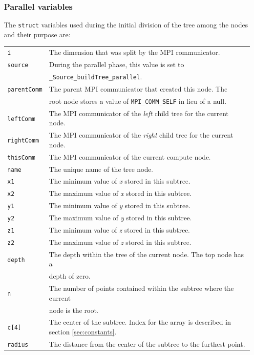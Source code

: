 \documentclass{article}
\begin{document}
%
%

\subsubsection{Parallel variables}

The \texttt{struct} variables used during the initial division of the tree among the nodes and their purpose are:

\begin{tabular}{l l}
\texttt{i} & The dimension that was split by the MPI communicator.  \\
\texttt{source} & During the parallel phase, this value is set to  \\
& \texttt{\_Source\_buildTree\_parallel}.  \\
\texttt{parentComm} & The parent MPI communicator that created this node. The\\
&  root node stores a value of \texttt{MPI\_COMM\_SELF} in lieu of a null. \\
\texttt{leftComm} & The MPI communicator of the \textit{left} child tree for the current node.  \\
\texttt{rightComm} & The MPI communicator of the \textit{right} child tree for the current node.  \\
\texttt{thisComm} & The MPI communicator of the current compute node.  \\
\texttt{name} & The unique name of the tree node. \\
\texttt{x1} & The minimum value of \textit{x} stored in this subtree.  \\
\texttt{x2} & The maximum value of \textit{x} stored in this subtree.  \\
\texttt{y1} & The minimum value of \textit{y} stored in this subtree.  \\
\texttt{y2} & The maximum value of \textit{y} stored in this subtree.  \\
\texttt{z1} & The minimum value of \textit{z} stored in this subtree.  \\
\texttt{z2} & The maximum value of \textit{z} stored in this subtree.  \\
\texttt{depth} & The depth within the tree of the current node. The top node has a \\
& depth of zero.  \\
\texttt{n} & The number of points contained within the subtree where the current \\
& node is the root.  \\
\texttt{c[4]} & The center of the subtree. Index for the array is described in section \ref{sec:constants}. \\
\texttt{radius} & The distance from the center of the subtree to the furthest point.  \\
\end{tabular}
\end{document}
